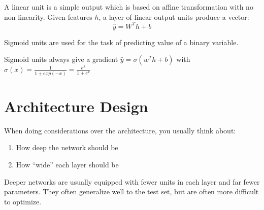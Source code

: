 A linear unit is a simple output which is based on affine transformation with no non-linearity. Given features $h$, a layer of linear output units produce a vector:
\[
	\hat{y} = W^{T}h + b
\]

Sigmoid units are used for the task of predicting value of a binary variable.

Sigmoid units always give a gradient $\hat{y} = \sigma(w^{T}h+b)$ with \(\sigma(x) = \frac{1}{1+exp(-x)} = \frac{e^{x}}{1+e^{x}}\)

\section{Architecture Design}%
\label{sec:label}

When doing considerations over the architecture, you usually think about:
\begin{enumerate}
	\item How deep the network should be
	\item How ``wide'' each layer should be
\end{enumerate}

Deeper networks are usually equipped with fewer units in each layer and far fewer parameters. They often generalize well to the test set, but are often more difficult to optimize.


